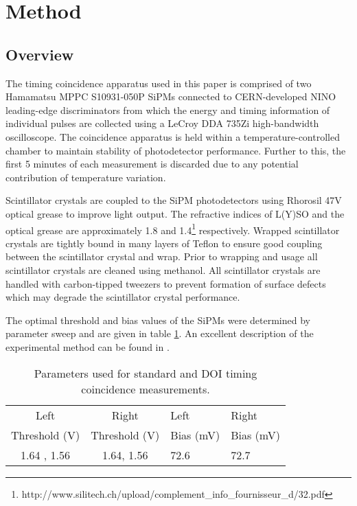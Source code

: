 \section{Method}
\subsection{Overview}
The timing coincidence apparatus used in this paper is comprised of two Hamamatsu MPPC S10931-050P SiPMs connected to CERN-developed NINO leading-edge discriminators from which the energy and timing information of individual pulses are collected using a LeCroy DDA 735Zi high-bandwidth oscilloscope. The coincidence apparatus is held within a temperature-controlled chamber to maintain stability of photodetector performance. Further to this, the first 5 minutes of each measurement is discarded due to any potential contribution of temperature variation.

Scintillator crystals are coupled to the SiPM photodetectors using Rhorosil 47V optical grease to improve light output. The refractive indices of L(Y)SO and the optical grease are approximately 1.8 and 1.4\footnote{http://www.silitech.ch/upload/complement_info_fournisseur_d/32.pdf} respectively.
 Wrapped scintillator crystals are tightly bound in many layers of Teflon to ensure good coupling between the scintillator crystal and wrap. Prior to wrapping and usage all scintillator crystals are cleaned using methanol. All scintillator crystals are handled with carbon-tipped tweezers to prevent formation of surface defects which may degrade the scintillator crystal performance. 

The optimal threshold and bias values of the SiPMs were determined by parameter sweep and are given in table \ref{tab:optimumparam}. An excellent description of the experimental method can be found in \cite{ch_Meyer_Pizzichemi_Lecoq_2013}.

\begin{table}
\caption{\label{tab:optimumparam} Parameters used for standard and DOI timing coincidence measurements.} 
\begin{tabular}{ccll}
\hline
Left &  Right & Left & Right\\
Threshold (V) & Threshold (V)& Bias (mV) & Bias (mV)\\
\hline
1.64 , 1.56 &  1.64, 1.56 &  72.6 &  72.7\\
\hline
\end{tabular}
\end{table}

